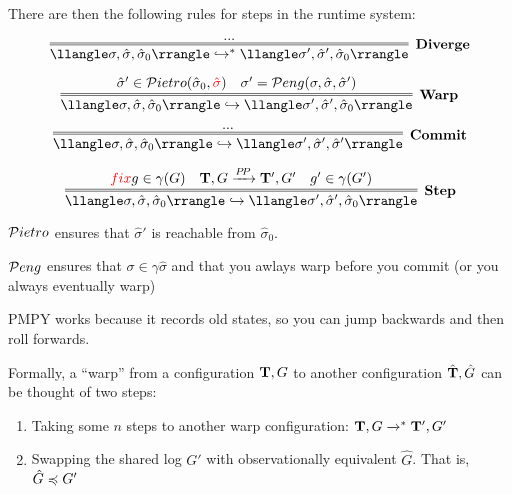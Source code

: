 There are then the following rules for steps in the runtime system:

$$
\infer=[\text{\bf Diverge}]{
   \llangle \sigma,\hat{\sigma},\hat{\sigma}_0 \rrangle 
  \hookrightarrow^{*}
   \llangle \sigma',\hat{\sigma}',\hat{\sigma}_0 \rrangle 
}{ ... }
$$


$$
\infer=[\text{\bf Warp}]{
  \llangle \sigma,\hat{\sigma},\hat{\sigma}_0 \rrangle
  \hookrightarrow
  \llangle \sigma',\hat{\sigma}',\hat{\sigma}_0 \rrangle
}{
    \hat{\sigma}' \in \Pietrot(\hat{\sigma}_0,\red{\hat{\sigma}})
  & \sigma' = \Pengt(\sigma,\hat{\sigma},\hat{\sigma}')
}
$$

$$
\infer=[\text{\bf Commit}]{
  \llangle \sigma,\hat{\sigma},\hat{\sigma}_0 \rrangle
  \hookrightarrow
  \llangle \sigma',\hat{\sigma}',\hat{\sigma}' \rrangle
}{ ... }
$$

$$
\infer=[\text{\bf Step}]{
  \llangle \sigma,\hat{\sigma},\hat{\sigma}_0 \rrangle
  \hookrightarrow
  \llangle \sigma',\hat{\sigma}',\hat{\sigma}_0 \rrangle
}{
\red{fix}
  g \in \gamma(G)
& \Ts,G \xrightarrow{P\! P} \Ts',G'
& g' \in \gamma(G')}
$$

${\cal P}ietro$ ensures that $\hat{\sigma}'$ is reachable from $\hat{\sigma}_0$.

${\cal P}eng$ ensures that $\sigma\in\gamma{\hat{\sigma}}$
and that you awlays warp before you commit (or you always eventually
warp)




\vfill
\pagebreak

\bigskip 
\bigskip 
\bigskip 


PMPY works because it records old states, so you can jump backwards
and then roll forwards.


Formally, a ``warp'' from a configuration $\mathbf{T},G$ to another
configuration $\hat{\mathbf{T}},\hat{G}$ can be thought of two steps:
\begin{enumerate}
\item Taking some $n$ steps to another warp configuration:
  $\mathbf{T},G \xrightarrow{}^{*} \mathbf{T}',G'$
\item Swapping the shared log $G'$ with observationally equivalent
  $\hat{G}$. That is,  $\hat{G} \preccurlyeq G'$
\end{enumerate}


